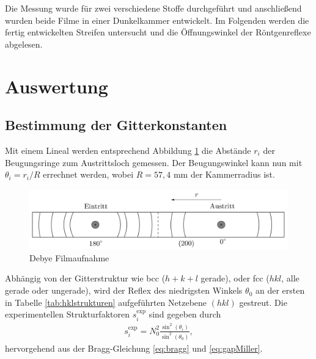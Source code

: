 Die Messung wurde für zwei verschiedene Stoffe durchgeführt und anschließend wurden beide Filme in einer Dunkelkammer entwickelt. Im Folgenden werden die fertig entwickelten Streifen untersucht und die Öffnungswinkel der Röntgenreflexe abgelesen.  

\section{Auswertung}
\subsection{Bestimmung der Gitterkonstanten}
Mit einem Lineal werden entsprechend Abbildung \ref{pic:debyefilm} die Abstände $r_i$ der Beugungsringe zum Austrittsloch gemessen. Der 
Beugungswinkel kann nun mit $\theta_i = r_i/R$ errechnet werden, wobei $R=57,4$ mm der Kammerradius ist. 
\begin{figure}[H]
 \includegraphics[width=\textwidth]{../pics/debyestreifen.jpg}
 \caption{Debye Filmaufnahme}
 \label{pic:debyefilm}
\end{figure}
\noindent Abhängig von der Gitterstruktur wie bcc ($h+k+l$ gerade), oder fcc ($hkl$, alle gerade oder ungerade),
wird der Reflex des niedrigsten Winkels $\theta_0$ an der ersten in Tabelle \ref{tab:hklstrukturen} aufgeführten Netzebene $(hkl)$
gestreut. 
Die experimentellen Strukturfaktoren $s^\text{exp}_i$ sind gegeben durch
\begin{align}
 s^\text{exp}_i = N^2_0 \frac{\sin^2(\theta_i)}{\sin^2(\theta_0)},
 \label{eq:structExp}
\end{align}
hervorgehend aus der Bragg-Gleichung \eqref{eq:bragg} und \eqref{eq:gapMiller}.
